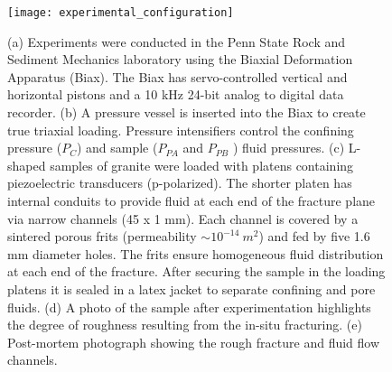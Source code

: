 \documentclass[letterpaper,10pt]{article}
\begin{document}
	\newpage
	
	\begin{figure}[ht]
		\centering
		\texttt{[image: experimental\_configuration]}
		\caption[]{(a) Experiments were conducted in the Penn State Rock and Sediment Mechanics laboratory using the Biaxial Deformation Apparatus (Biax). The Biax has servo-controlled vertical and horizontal pistons and a 10 kHz 24-bit analog to digital data recorder. (b) A pressure vessel is inserted into the Biax to create true triaxial loading. Pressure intensifiers control the confining pressure ($P_C$) and sample ($P_{PA}$ and $P_{PB}$ ) fluid pressures. (c) L-shaped samples of granite were loaded with platens containing piezoelectric transducers (p-polarized). The shorter platen has internal conduits to provide fluid at each end of the fracture plane via narrow channels (45 x 1 mm). Each channel is covered by a sintered porous frits (permeability $\sim 10^{-14}\ m^2$) and fed by five 1.6 mm diameter holes. The frits ensure homogeneous fluid distribution at each end of the fracture. After securing the sample in the loading platens it is sealed in a latex jacket to separate confining and pore fluids. (d) A photo of the sample after experimentation highlights the degree of roughness resulting from the in-situ fracturing. (e) Post-mortem photograph showing the rough fracture and fluid flow channels. }
		\label{fig:samplesetup}
	\end{figure}
	
	\newpage
	
\end{document}

